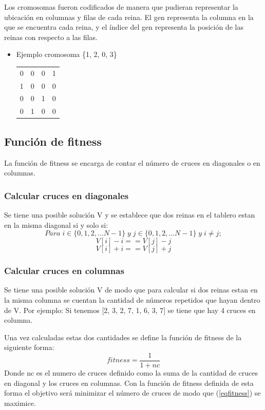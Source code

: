 \documentclass[11pt]{article}
\begin{document}
Los cromosomas fueron codificados de manera que pudieran representar la ubicaci\'on en columnas y filas de cada reina. El gen representa la columna en la que se encuentra cada reina, y el \'indice del gen representa la posici\'on de las reinas con respecto a las filas.
\begin{itemize}
\item Ejemplo cromosoma \{1, 2, 0, 3\}
\begin{center}
\begin{tabular}{ c c c c }
	0 & 0 & 0 & 1\\
	1 & 0 & 0 & 0\\
	0 & 0 & 1 & 0\\
	0 & 1 & 0 & 0
\end{tabular}
\end{center}
\end{itemize}
\subsection{Funci\'on de fitness}
La funci\'on de fitness se encarga de contar el n\'umero de
cruces en diagonales o en columnas.
\subsubsection{Calcular cruces en diagonales}
Se tiene una posible soluci\'on V y se establece que dos reinas en el tablero estan en la misma diagonal si y solo si:
\[Para\;i \in \{0, 1, 2, ... N-1\}\;y\;j \in \{0, 1, 2, ... N-1\}\;y\;i \neq j;\]
\[V[i] - i == V[j] - j\]
\[V[i] + i == V[j] + j\]
\subsubsection{Calcular cruces en columnas}
Se tiene una posible soluci\'on V de modo que para calcular si dos reinas estan en la
misma columna se cuentan la cantidad de n\'umeros repetidos que hayan dentro de V.
Por ejemplo: Si tenemos [2, 3, 2, 7, 1, 6, 3, 7] se tiene que hay 4 cruces en columna.

Una vez calculadas estas dos cantidades se define la funci\'on de fitness de la siguiente
forma:
\begin{equation}\label{eqfitness}
    fitness = \frac{1}{1+nc}
\end{equation}
Donde nc es el numero de cruces definido como la suma de la cantidad de cruces en diagonal
y los cruces en columnas.
Con la funci\'on de fitness definida de esta forma el objetivo ser\'a
minimizar el n\'umero de cruces de modo que (\ref{eqfitness}) se maximice.
\end{document}

